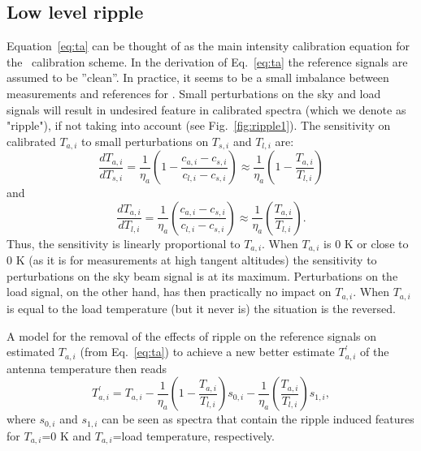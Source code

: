 \subsection{Low level ripple}
\label{sec:ripples}
Equation~\ref{eq:ta} can be thought of as the main intensity
calibration equation for the \smr\ calibration scheme.
In the derivation of Eq.~\ref{eq:ta}
the reference signals are assumed to be ''clean''.
In practice, it seems to be a small imbalance between 
measurements and references for \smr. 
Small perturbations on the sky and load signals will
result in undesired feature in calibrated
spectra (which we denote as "ripple"), 
if not taking into account (see Fig.~\ref{fig:ripple1}).
The sensitivity on calibrated \(T_{a,i}\) 
to small perturbations on \(T_{s,i}\) and \(T_{l,i}\) are:
\begin{equation}
\frac{dT_{a,i}}{dT_{s,i}}=\frac{1}{\eta_{a}}\left(1-\frac{c_{a,i}-c_{s,i}}{c_{l,i}-c_{s,i}}\right)\approx \frac{1}{\eta_{a}}\left(1-\frac{T_{a,i}}{T_{l,i}}\right)
\end{equation}
and
\begin{equation}
\frac{dT_{a,i}}{dT_{l,i}}=\frac{1}{\eta_{a}}\left(\frac{c_{a,i}-c_{s,i}}{c_{l,i}-c_{s,i}}\right)\approx \frac{1}{\eta_{a}}\left(\frac{T_{a,i}}{T_{l,i}}\right).
\end{equation}
Thus, the sensitivity is linearly proportional to \(T_{a,i}\).
When \(T_{a,i}\) is 0 K or close to 0 K (as it is for measurements at high
tangent altitudes) the sensitivity to perturbations on
the sky beam signal is at its maximum.
Perturbations on the load signal, on the other hand, has then practically
no impact on \(T_{a,i}\).
When \(T_{a,i}\) is equal to the load temperature (but it never is)
the situation is the reversed.

A model for the removal of the effects of ripple on the reference signals
on estimated \(T_{a,i}\) (from Eq.~\ref{eq:ta}) to achieve a new
better estimate \(T^{'}_{a,i}\) of the antenna temperature then reads
\begin{equation}
\label{correction}
T^{'}_{a,i}=T_{a,i}-\frac{1}{\eta_{a}}\left(1-\frac{T_{a,i}}{T_{l,i}}\right) s_{0,i}-
 \frac{1}{\eta_{a}}\left(\frac{T_{a,i}}{T_{l,i}}\right) s_{1,i},
\end{equation}
where \(s_{0,i}\) and \(s_{1,i}\) can be seen as spectra that contain
the ripple induced features for \(T_{a,i}\)=0 K and \(T_{a,i}\)=load temperature,
respectively.

